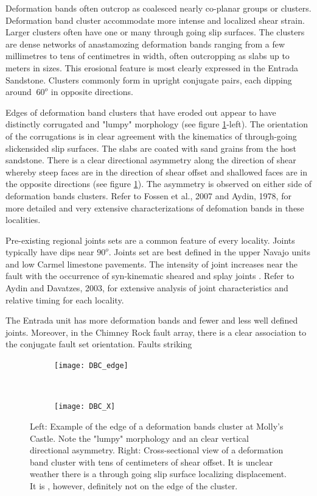 \documentclass[12pt,a4paper]{article}
\begin{document}
Deformation bands often outcrop as coalesced nearly co-planar groups or clusters. Deformation band cluster accommodate more intense and localized shear strain. Larger clusters often have one or many through going slip surfaces. The clusters are dense networks of anastamozing deformation bands ranging from a few millimetres to tens of centimetres in width, often outcropping as slabs up to meters in sizes. This erosional feature is most clearly expressed in the Entrada Sandstone. Clusters commonly form in upright conjugate pairs, each dipping around $~60^o$ in opposite directions.   

Edges of deformation band clusters that have eroded out appear to have distinctly corrugated and "lumpy" morphology (see figure \ref{DBC}-left). The orientation of the corrugations is in clear agreement with the kinematics of through-going slickensided slip surfaces. The slabs are coated with sand grains from the host sandstone. There is a clear directional asymmetry along the direction of shear whereby steep faces are in the direction of shear offset and shallowed faces are in the opposite directions (see figure \ref{DBC}). The asymmetry is observed on either side of deformation bands clusters. Refer to Fossen et al., 2007 and Aydin, 1978, for more detailed and very extensive characterizations of defomation bands in these localities.

Pre-existing regional joints sets are a common feature of every locality.  Joints typically have dips near $90^o$. Joints set are best defined in the upper Navajo units and low Carmel limestone pavements. The intensity of joint increases near the fault with the occurrence of syn-kinematic sheared and splay joints \cite{davatzes2003overprinting}. Refer to Aydin and Davatzes, 2003, for extensive analysis of joint characteristics and relative timing for each locality.

The Entrada unit has more deformation bands and fewer and less well defined joints. Moreover, in the Chimney Rock fault array, there is a clear association to the conjugate fault set orientation. Faults striking 

 \begin{figure}[H]
	\centering
	\begin{subfigure}[b]{0.4\textwidth}
		\texttt{[image: DBC\_edge]}
	\end{subfigure}
	~
	\begin{subfigure}[b]{0.4\textwidth}
		\texttt{[image: DBC\_X]}
	\end{subfigure}
	\caption{Left: Example of the edge of a deformation bands cluster at Molly's Castle. Note the "lumpy" morphology and an clear vertical directional asymmetry. Right: Cross-sectional view of a deformation band cluster with tens of centimeters of shear offset. It is unclear weather there is a through going slip surface localizing displacement. It is , however, definitely not on the edge of the cluster.}
	\label{DBC}
\end{figure}		
\end{document}
